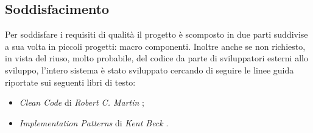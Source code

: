 \documentclass[../RelazioneFinale]{subfiles}
\begin{document}
			\subsection{Soddisfacimento}
				Per soddisfare i requisiti di qualità il progetto è scomposto in due parti suddivise a sua volta in piccoli progetti: macro componenti.
			Inoltre anche se non richiesto, in vista del riuso, molto probabile, del codice da parte di sviluppatori esterni allo sviluppo, l'intero sistema è stato sviluppato cercando di seguire le linee guida riportate sui seguenti libri di testo:
			\begin{itemize}
				\item \emph{Clean Code} di \emph{Robert C. Martin}  \cite{martin2009clean};
				\item \emph{Implementation Patterns} di \emph{Kent Beck} \cite{beck2008implementation}.
			\end{itemize}		
\end{document}
